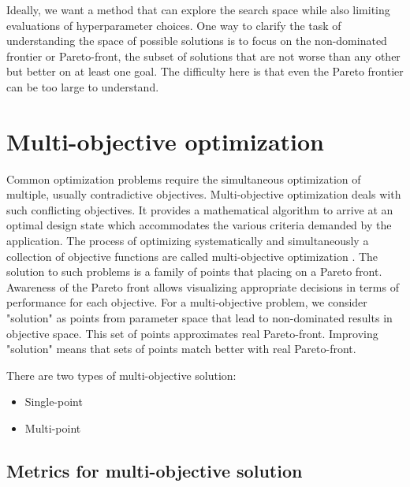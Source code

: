         Ideally, we want a method that can explore the search space while also limiting evaluations of hyperparameter choices. 
        One way to clarify the task of understanding the space of possible solutions is to focus on the non-dominated frontier or Pareto-front, the subset of solutions that are not worse than any other but better on at least one goal. The difficulty here is that even the Pareto frontier can be too large to understand. 
    

    \section{Multi-objective optimization}
        Common optimization problems require the simultaneous optimization of multiple, usually contradictive objectives.         Multi-objective optimization deals with such conflicting objectives. It provides a mathematical algorithm to arrive at an optimal design state which accommodates the various criteria demanded by the application. The process of optimizing systematically and simultaneously a collection of objective functions are called multi-objective optimization \cite{odugod2013}. The solution to such problems is a family of points that placing on a Pareto front. Awareness of the Pareto front allows visualizing appropriate decisions in terms of performance for each objective. For a multi-objective problem, we consider "solution" as points from parameter space that lead to non-dominated results in objective space. This set of points approximates real Pareto-front. Improving "solution" means that sets of points match better with real Pareto-front.

        There are two types of multi-objective solution:
        \begin{itemize}
            \item Single-point
            \item Multi-point
        \end{itemize}

        \subsection{Metrics for multi-objective solution}

